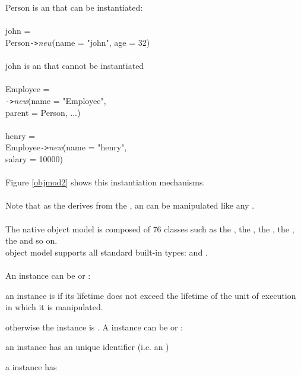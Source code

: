 \\
\\
\textsf{Person} is an  that can be instantiated:
\\
\\
\ixx {} \textsf{john} =\\
\ixy  \textsf{Person}\texttt{->}\emph{new}(name = "john", age = 32)
\\
\\
\textsf{john} is an  that cannot be instantiated
\\
\\
\ixx{} \textsf{Employee} =\\
\ixy  {}\texttt{->}\emph{new}(name = "Employee",\\
\ixy   parent = \textsf{Person}, ...)
\\
\\
\ixx {} \textsf{henry} =\\
\ixy  \textsf{Employee}\texttt{->}\emph{new}(name = "henry",\\
\ixy  salary = 10000)
\\
\\
Figure \ref{objmod2} shows this instantiation mechanisms.
\\
\\
Note that as the  derives from the ,
an  can be manipulated like any .
\\
\\
The native \eyedb object model is composed of 76 classes
such as the , the ,
the , the , the 
and so on.
\\
\eyedb object model supports all standard built-in types:
 and .
\\
\\
An instance can be  or :
\bi
\item an instance is  if its lifetime does not exceed the
lifetime of the unit of execution in which it is manipulated.
\item otherwise the instance is .
\ei
A  instance can be  or :
\bi
\item an   instance has an unique identifier
(i.e. an \oidx)
\item a   instance has
